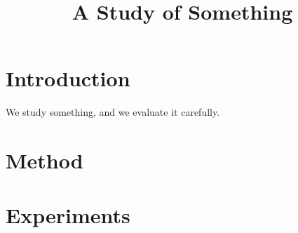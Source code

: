 \documentclass{article}
\begin{document}
\title{A Study of Something}
\maketitle

\section{Introduction}
We study something, and we evaluate it carefully.

\section{Method}
\section{Experiments}
\end{document}
